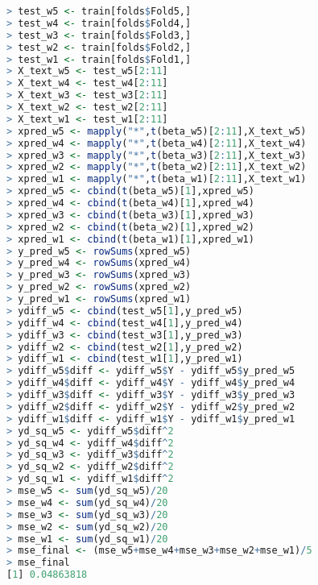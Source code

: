 \documentclass[fontsize=10pt,DIV=14]{scrartcl}
\begin{document}
\begin{enumerate}
\begin{itemize}
			\begin{lstlisting}[language=R,frame=single]
> test_w5 <- train[folds$Fold5,]
> test_w4 <- train[folds$Fold4,]
> test_w3 <- train[folds$Fold3,]
> test_w2 <- train[folds$Fold2,]
> test_w1 <- train[folds$Fold1,]
> X_text_w5 <- test_w5[2:11]
> X_text_w4 <- test_w4[2:11]
> X_text_w3 <- test_w3[2:11]
> X_text_w2 <- test_w2[2:11]
> X_text_w1 <- test_w1[2:11]
> xpred_w5 <- mapply("*",t(beta_w5)[2:11],X_text_w5)
> xpred_w4 <- mapply("*",t(beta_w4)[2:11],X_text_w4)
> xpred_w3 <- mapply("*",t(beta_w3)[2:11],X_text_w3)
> xpred_w2 <- mapply("*",t(beta_w2)[2:11],X_text_w2)
> xpred_w1 <- mapply("*",t(beta_w1)[2:11],X_text_w1)
> xpred_w5 <- cbind(t(beta_w5)[1],xpred_w5)
> xpred_w4 <- cbind(t(beta_w4)[1],xpred_w4)
> xpred_w3 <- cbind(t(beta_w3)[1],xpred_w3)
> xpred_w2 <- cbind(t(beta_w2)[1],xpred_w2)
> xpred_w1 <- cbind(t(beta_w1)[1],xpred_w1)
> y_pred_w5 <- rowSums(xpred_w5)
> y_pred_w4 <- rowSums(xpred_w4)
> y_pred_w3 <- rowSums(xpred_w3)
> y_pred_w2 <- rowSums(xpred_w2)
> y_pred_w1 <- rowSums(xpred_w1)
> ydiff_w5 <- cbind(test_w5[1],y_pred_w5)
> ydiff_w4 <- cbind(test_w4[1],y_pred_w4)
> ydiff_w3 <- cbind(test_w3[1],y_pred_w3)
> ydiff_w2 <- cbind(test_w2[1],y_pred_w2)
> ydiff_w1 <- cbind(test_w1[1],y_pred_w1)
> ydiff_w5$diff <- ydiff_w5$Y - ydiff_w5$y_pred_w5
> ydiff_w4$diff <- ydiff_w4$Y - ydiff_w4$y_pred_w4
> ydiff_w3$diff <- ydiff_w3$Y - ydiff_w3$y_pred_w3
> ydiff_w2$diff <- ydiff_w2$Y - ydiff_w2$y_pred_w2
> ydiff_w1$diff <- ydiff_w1$Y - ydiff_w1$y_pred_w1
> yd_sq_w5 <- ydiff_w5$diff^2
> yd_sq_w4 <- ydiff_w4$diff^2
> yd_sq_w3 <- ydiff_w3$diff^2
> yd_sq_w2 <- ydiff_w2$diff^2
> yd_sq_w1 <- ydiff_w1$diff^2
> mse_w5 <- sum(yd_sq_w5)/20
> mse_w4 <- sum(yd_sq_w4)/20
> mse_w3 <- sum(yd_sq_w3)/20
> mse_w2 <- sum(yd_sq_w2)/20
> mse_w1 <- sum(yd_sq_w1)/20
> mse_final <- (mse_w5+mse_w4+mse_w3+mse_w2+mse_w1)/5
> mse_final
[1] 0.04863818
			\end{lstlisting}
		\end{itemize}
	\end{enumerate}
\end{document}
